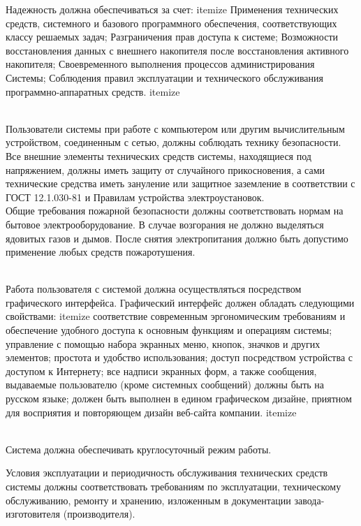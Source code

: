 \documentclass[russian, utf8, 12pt,pointsubsection,floatsubsection]{eskdtext}
\begin{document}
Надежность должна обеспечиваться за счет:
itemize
Применения технических средств, системного и базового программного обеспечения, соответствующих классу решаемых задач;
Разграничения прав доступа к системе;
Возможности восстановления данных с внешнего накопителя после восстановления активного накопителя;
Своевременного выполнения процессов администрирования Системы;
Соблюдения правил эксплуатации и технического обслуживания программно-аппаратных средств.
itemize


\\

Пользователи системы при работе с компьютером или другим вычислительным устройством, соединенным с сетью, должны соблюдать технику безопасности. Все внешние элементы технических средств системы, находящиеся под напряжением, должны иметь защиту от случайного прикосновения, а сами технические средства иметь зануление или защитное заземление в соответствии с ГОСТ 12.1.030-81 и Правилам устройства электроустановок.\\

Общие требования пожарной безопасности должны соответствовать нормам на бытовое электрооборудование. В случае возгорания не должно выделяться ядовитых газов и дымов. После снятия электропитания должно быть допустимо применение любых средств пожаротушения.

\\
Работа пользователя с системой должна осуществляться посредством графического интерфейса. Графический интерфейс должен обладать следующими свойствами:
itemize
соответствие современным эргономическим требованиям и обеспечение удобного доступа к основным функциям и операциям системы;
управление с помощью набора экранных меню, кнопок, значков и других элементов;
простота и удобство использования;
доступ посредством устройства с доступом к Интернету;
все надписи экранных форм, а также сообщения, выдаваемые
пользователю (кроме системных сообщений) должны быть на русском языке;
должен быть выполнен в едином графическом дизайне, приятном для восприятия и повторяющем дизайн веб-сайта компании.
itemize

\\
Система должна обеспечивать круглосуточный режим работы.

Условия эксплуатации и периодичность обслуживания технических средств системы должны соответствовать требованиям по эксплуатации, техническому обслуживанию, ремонту и хранению, изложенным в документации завода-изготовителя (производителя).\\
\end{document}

